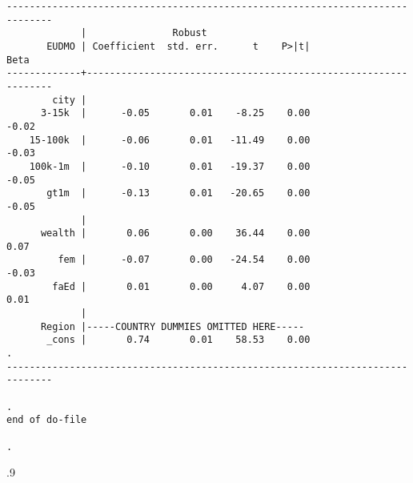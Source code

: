 \documentclass[11pt, letterpaper]{article}
\begin{document}
\begin{spacing}{1.9}
\begin{spacing}{.5}
\begin{scriptsize}
\begin{verbatim}
------------------------------------------------------------------------------
             |               Robust
       EUDMO | Coefficient  std. err.      t    P>|t|                     Beta
-------------+----------------------------------------------------------------
        city |
      3-15k  |      -0.05       0.01    -8.25    0.00                    -0.02
    15-100k  |      -0.06       0.01   -11.49    0.00                    -0.03
    100k-1m  |      -0.10       0.01   -19.37    0.00                    -0.05
       gt1m  |      -0.13       0.01   -20.65    0.00                    -0.05
             |
      wealth |       0.06       0.00    36.44    0.00                     0.07
         fem |      -0.07       0.00   -24.54    0.00                    -0.03
        faEd |       0.01       0.00     4.07    0.00                     0.01
             |
      Region |-----COUNTRY DUMMIES OMITTED HERE-----
       _cons |       0.74       0.01    58.53    0.00                        .
------------------------------------------------------------------------------

. 
end of do-file

. 

\end{verbatim}
\end{scriptsize}
\end{spacing}{.9}









\end{spacing}
\end{document}
